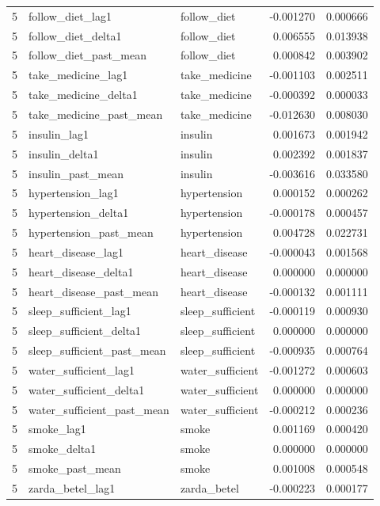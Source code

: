 \begin{longtable}{rllrr}
5 & follow\_diet\_lag1 & follow\_diet & -0.001270 & 0.000666 \\
5 & follow\_diet\_delta1 & follow\_diet & 0.006555 & 0.013938 \\
5 & follow\_diet\_past\_mean & follow\_diet & 0.000842 & 0.003902 \\
5 & take\_medicine\_lag1 & take\_medicine & -0.001103 & 0.002511 \\
5 & take\_medicine\_delta1 & take\_medicine & -0.000392 & 0.000033 \\
5 & take\_medicine\_past\_mean & take\_medicine & -0.012630 & 0.008030 \\
5 & insulin\_lag1 & insulin & 0.001673 & 0.001942 \\
5 & insulin\_delta1 & insulin & 0.002392 & 0.001837 \\
5 & insulin\_past\_mean & insulin & -0.003616 & 0.033580 \\
5 & hypertension\_lag1 & hypertension & 0.000152 & 0.000262 \\
5 & hypertension\_delta1 & hypertension & -0.000178 & 0.000457 \\
5 & hypertension\_past\_mean & hypertension & 0.004728 & 0.022731 \\
5 & heart\_disease\_lag1 & heart\_disease & -0.000043 & 0.001568 \\
5 & heart\_disease\_delta1 & heart\_disease & 0.000000 & 0.000000 \\
5 & heart\_disease\_past\_mean & heart\_disease & -0.000132 & 0.001111 \\
5 & sleep\_sufficient\_lag1 & sleep\_sufficient & -0.000119 & 0.000930 \\
5 & sleep\_sufficient\_delta1 & sleep\_sufficient & 0.000000 & 0.000000 \\
5 & sleep\_sufficient\_past\_mean & sleep\_sufficient & -0.000935 & 0.000764 \\
5 & water\_sufficient\_lag1 & water\_sufficient & -0.001272 & 0.000603 \\
5 & water\_sufficient\_delta1 & water\_sufficient & 0.000000 & 0.000000 \\
5 & water\_sufficient\_past\_mean & water\_sufficient & -0.000212 & 0.000236 \\
5 & smoke\_lag1 & smoke & 0.001169 & 0.000420 \\
5 & smoke\_delta1 & smoke & 0.000000 & 0.000000 \\
5 & smoke\_past\_mean & smoke & 0.001008 & 0.000548 \\
5 & zarda\_betel\_lag1 & zarda\_betel & -0.000223 & 0.000177 \\

\end{longtable}
